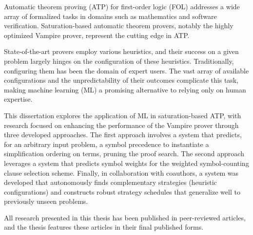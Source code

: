 Automatic theorem proving (ATP) for first-order logic (FOL) addresses a wide array of formalized tasks in domains such as mathematics and software verification. Saturation-based automatic theorem provers, notably the highly optimized Vampire prover, represent the cutting edge in ATP.

State-of-the-art provers employ various heuristics, and their success on a given problem largely hinges on the configuration of these heuristics. Traditionally, configuring them has been the domain of expert users. The vast array of available configurations and the unpredictability of their outcomes complicate this task, making machine learning (ML) a promising alternative to relying only on human expertise.

This dissertation explores the application of ML in saturation-based ATP, with research focused on enhancing the performance of the Vampire prover through three developed approaches. The first approach involves a system that predicts, for an arbitrary input problem, a symbol precedence to instantiate a simplification ordering on terms, pruning the proof search. The second approach leverages a system that predicts symbol weights for the weighted symbol-counting clause selection scheme. Finally, in collaboration with coauthors, a system was developed that autonomously finds complementary strategies (heuristic configurations) and constructs robust strategy schedules that generalize well to previously unseen problems.

All research presented in this thesis has been published in peer-reviewed articles, and the thesis features these articles in their final published forms.
